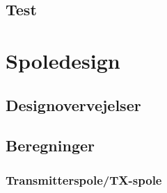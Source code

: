\documentclass[../main.tex]{subfiles}
\begin{document}
\subsection{Test}

\section{Spoledesign}
\subsection{Designovervejelser}


\subsection{Beregninger}

\subsubsection{Transmitterspole/TX-spole}
\end{document}

